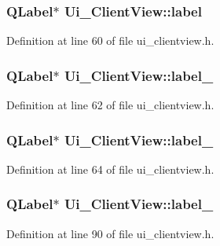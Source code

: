 \subsubsection[{label}]{\setlength{\rightskip}{0pt plus 5cm}Q\+Label$\ast$ Ui\+\_\+\+Client\+View\+::label}\label{class_ui___client_view_a65f087e517845c4943ada68765528b7c}


Definition at line 60 of file ui\+\_\+clientview.\+h.

\hypertarget{class_ui___client_view_a4b3b712ef57c0b26b0cf24fb673ef215}{}
\subsubsection[{label\+\_\+2}]{\setlength{\rightskip}{0pt plus 5cm}Q\+Label$\ast$ Ui\+\_\+\+Client\+View\+::label\+\_}\label{class_ui___client_view_a4b3b712ef57c0b26b0cf24fb673ef215}


Definition at line 62 of file ui\+\_\+clientview.\+h.

\hypertarget{class_ui___client_view_a4cc717778a48b972383c7e9c57c9312d}{}
\subsubsection[{label\+\_\+3}]{\setlength{\rightskip}{0pt plus 5cm}Q\+Label$\ast$ Ui\+\_\+\+Client\+View\+::label\+\_}\label{class_ui___client_view_a4cc717778a48b972383c7e9c57c9312d}


Definition at line 64 of file ui\+\_\+clientview.\+h.

\hypertarget{class_ui___client_view_a40d9710e0ace8c11b19a948f02fe8b53}{}
\subsubsection[{label\+\_\+4}]{\setlength{\rightskip}{0pt plus 5cm}Q\+Label$\ast$ Ui\+\_\+\+Client\+View\+::label\+\_}\label{class_ui___client_view_a40d9710e0ace8c11b19a948f02fe8b53}


Definition at line 90 of file ui\+\_\+clientview.\+h.

